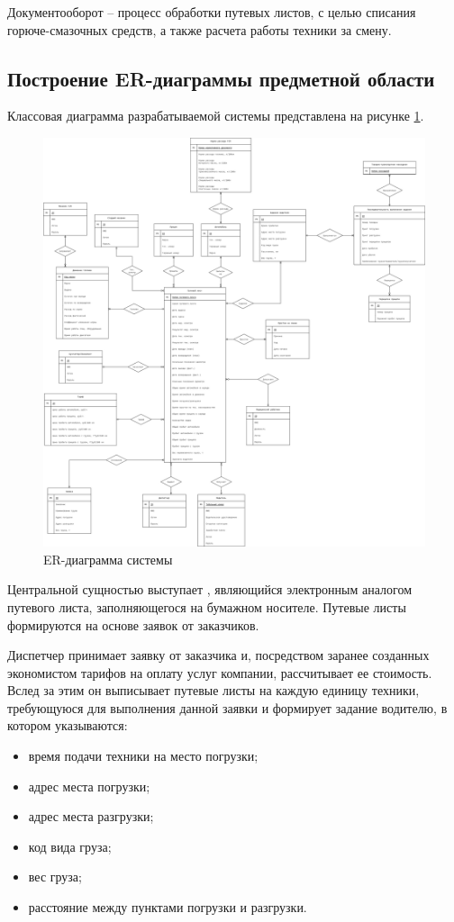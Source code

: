 \documentclass[../nirs.tex]{subfiles}
\begin{document}
Документооборот -- процесс обработки путевых листов, с целью списания
горюче-смазочных средств, а также расчета работы техники за смену.

\subsection{Построение ER-диаграммы предметной области}
Классовая диаграмма разрабатываемой системы представлена на рисунке
\ref{fig:2_1_3_er_diagram}.

\begin{figure}[hp!]
	\centering
	\includegraphics[keepaspectratio,width=\textwidth]{./images/2_1_3_er-diagram.png}
	\caption{ER-диаграмма системы}
	\label{fig:2_1_3_er_diagram}
\end{figure}

\pagebreak

Центральной сущностью выступает , являющийся
электронным аналогом путевого листа, заполняющегося на бумажном носителе.
Путевые листы формируются на основе заявок от заказчиков.

Диспетчер принимает заявку от заказчика и, посредством заранее созданных
экономистом тарифов на оплату услуг компании, рассчитывает ее стоимость. Вслед
за этим он выписывает путевые листы на каждую единицу техники, требующуюся для
выполнения данной заявки и формирует задание водителю, в котором указываются:
\begin{itemize}
	\item время подачи техники на место погрузки;
	\item адрес места погрузки;
	\item адрес места разгрузки;
	\item код вида груза;
	\item вес груза;
	\item расстояние между пунктами погрузки и разгрузки.
\end{itemize}
\end{document}
